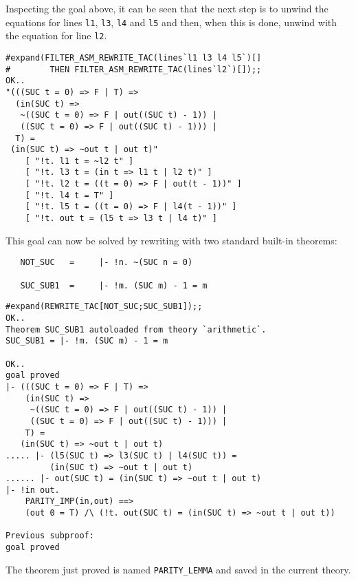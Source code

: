 Inspecting the goal above, it can be seen that the next step is to unwind
the equations for lines {\small\verb|l1|},
{\small\verb|l3|}, {\small\verb|l4|} and {\small\verb|l5|}
and then, when this is done, unwind with the equation for line
{\small\verb|l2|}.
\vfill
\newpage

\begin{session}
\begin{verbatim}
#expand(FILTER_ASM_REWRITE_TAC(lines`l1 l3 l4 l5`)[]
#        THEN FILTER_ASM_REWRITE_TAC(lines`l2`)[]);;
OK..
"(((SUC t = 0) => F | T) =>
  (in(SUC t) =>
   ~((SUC t = 0) => F | out((SUC t) - 1)) |
   ((SUC t = 0) => F | out((SUC t) - 1))) |
  T) =
 (in(SUC t) => ~out t | out t)"
    [ "!t. l1 t = ~l2 t" ]
    [ "!t. l3 t = (in t => l1 t | l2 t)" ]
    [ "!t. l2 t = ((t = 0) => F | out(t - 1))" ]
    [ "!t. l4 t = T" ]
    [ "!t. l5 t = ((t = 0) => F | l4(t - 1))" ]
    [ "!t. out t = (l5 t => l3 t | l4 t)" ]
\end{verbatim}
\end{session}

This goal can now be solved by rewriting with two
standard built-in theorems:

{\small\baselineskip\HOLSpacing\begin{verbatim}
   NOT_SUC   =     |- !n. ~(SUC n = 0)

   SUC_SUB1  =     |- !m. (SUC m) - 1 = m
\end{verbatim}}

\begin{session}
\begin{verbatim}
#expand(REWRITE_TAC[NOT_SUC;SUC_SUB1]);;
OK..
Theorem SUC_SUB1 autoloaded from theory `arithmetic`.
SUC_SUB1 = |- !m. (SUC m) - 1 = m

OK..
goal proved
|- (((SUC t = 0) => F | T) =>
    (in(SUC t) =>
     ~((SUC t = 0) => F | out((SUC t) - 1)) |
     ((SUC t = 0) => F | out((SUC t) - 1))) |
    T) =
   (in(SUC t) => ~out t | out t)
..... |- (l5(SUC t) => l3(SUC t) | l4(SUC t)) =
         (in(SUC t) => ~out t | out t)
...... |- out(SUC t) = (in(SUC t) => ~out t | out t)
|- !in out.
    PARITY_IMP(in,out) ==>
    (out 0 = T) /\ (!t. out(SUC t) = (in(SUC t) => ~out t | out t))

Previous subproof:
goal proved
\end{verbatim}
\end{session}

\noindent The theorem just proved is named
{\small\verb|PARITY_LEMMA|} and saved in the current theory.

